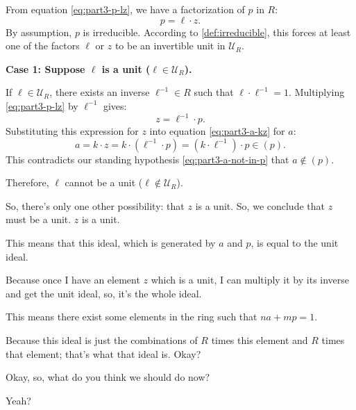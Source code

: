 \begin{proofWrapper}
\begin{content}
From equation \eqref{eq:part3-p-lz}, we have a factorization of $p$ in $R$:
\[
p = \ell \cdot z.
\]
By assumption, $p$ is irreducible. According to \cref{def:irreducible}, this forces at least one of the factors $\ell$ or $z$ to be an invertible unit in $\mathcal{U}_R$.

\textbf{Case 1: Suppose $\ell$ is a unit ($\ell \in \mathcal{U}_R$).}

If $\ell \in \mathcal{U}_R$, there exists an inverse $\ell^{-1} \in R$ such that $\ell \cdot \ell^{-1} = 1$. Multiplying \eqref{eq:part3-p-lz} by $\ell^{-1}$ gives:
\begin{equation}\label{eq:part3-z-is-linv-p}
z = \ell^{-1} \cdot p.
\end{equation}
Substituting this expression for $z$ into equation \eqref{eq:part3-a-kz} for $a$:
\begin{equation}\label{eq:part3-a-in-p-contradiction}
a = k \cdot z = k \cdot (\ell^{-1} \cdot p) = (k \cdot \ell^{-1}) \cdot p \in (p).
\end{equation}
This contradicts our standing hypothesis \eqref{eq:part3-a-not-in-p} that $a \notin (p)$. 

Therefore, $\ell$ cannot be a unit ($\ell \notin \mathcal{U}_R$).
\end{content}

\begin{speech}[00:54:02 - 00:55:24]
So, there's only one other possibility: that $z$ is a unit. So, we conclude that $z$ must be a unit.  $z$ is a unit.

This means that this ideal, which is generated by $a$ and $p$, is equal to the unit ideal. 

Because once I have an element $z$ which is a unit, I can multiply it by its inverse and get the unit ideal, so, it's the whole ideal.

This means there exist some elements in the ring such that $na + mp = 1$. 

Because this ideal is just the combinations of $R$ times this element and $R$ times that element; that's what that ideal is. Okay?

Okay, so, what do you think we should do now?

Yeah?
\end{speech}


\end{proofWrapper}
